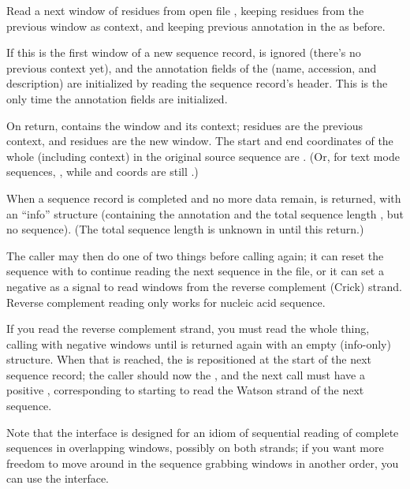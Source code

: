 \begin{sreapi}
Read a next window of  residues from open file ,
keeping  residues from the previous window as
context, and keeping previous annotation in the 
as before. 

If this is the first window of a new sequence record,
 is ignored (there's no previous context yet), and
the annotation fields of the  (name, accession, and
description) are initialized by reading the sequence
record's header. This is the only time the annotation
fields are initialized.

On return,  contains the window and its
context; residues  are the previous context,
and residues  are the new window.  The
start and end coordinates of the whole 
(including context) in the original source sequence are
. (Or, for text mode sequences,
, while  and
 coords are still .)

When a sequence record is completed and no more data
remain,  is returned, with an ``info'' 
structure (containing the annotation and the total
sequence length , but no sequence). (The total
sequence length  is unknown in  until this
 return.)

The caller may then do one of two things before calling
 again; it can reset the sequence
with  to continue reading the next
sequence in the file, or it can set a negative  as a
signal to read windows from the reverse complement
(Crick) strand. Reverse complement reading only works
for nucleic acid sequence. 

If you read the reverse complement strand, you must read
the whole thing, calling  with
negative  windows until  is returned again
with an empty (info-only)  structure. When that
 is reached, the  is repositioned at the
start of the next sequence record; the caller should now
 the , and the next 
call must have a positive , corresponding to starting
to read the Watson strand of the next sequence.

Note that the  interface is designed for
an idiom of sequential reading of complete sequences in
overlapping windows, possibly on both strands; if you
want more freedom to move around in the sequence
grabbing windows in another order, you can use the
 interface.


\end{sreapi}
